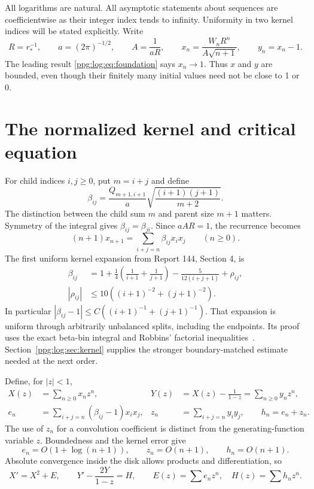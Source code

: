 \documentclass[11pt,letterpaper]{article}
\theoremstyle{remark}\newtheorem{remark}[theorem]{Remark}
\numberwithin{equation}{section}
\begin{document}
All logarithms are natural. All asymptotic statements about sequences are coefficientwise as their integer index tends to infinity. Uniformity in two kernel indices will be stated explicitly. Write
\begin{equation}\label{ppg:log:eq:normalization}
 R=r_*^{-1},\qquad a=(2\pi)^{-1/2},\qquad A=\frac1{aR},\qquad
 x_n=\frac{W_nR^n}{A\sqrt{n+1}},\qquad y_n=x_n-1.
\end{equation}
The leading result \eqref{ppg:log:eq:foundation} says $x_n\to1$. Thus $x$ and $y$ are bounded, even though their finitely many initial values need not be close to 1 or 0.

\section{The normalized kernel and critical equation}\label{ppg:log:sec:critical}
For child indices $i,j\ge0$, put $m=i+j$ and define
\begin{equation}\label{ppg:log:eq:beta}
 \beta_{ij}=\frac{Q_{m+1,i+1}}a
             \sqrt{\frac{(i+1)(j+1)}{m+2}}.
\end{equation}
The distinction between the child sum $m$ and parent size $m+1$ matters. Symmetry of the integral gives $\beta_{ij}=\beta_{ji}$. Since $aAR=1$, the recurrence becomes
\begin{equation}\label{ppg:log:eq:xrecurrence}
 (n+1)x_{n+1}=\sum_{i+j=n}\beta_{ij}x_ix_j\qquad(n\ge0).
\end{equation}
The first uniform kernel expansion from Report 144, Section 4, is
\begin{align}
 \beta_{ij}&=1+\frac14\left(\frac1{i+1}+\frac1{j+1}\right)
                    -\frac5{12(i+j+1)}+\rho_{ij},\label{ppg:log:eq:firstkernel}\\
 |\rho_{ij}|&\le10\left((i+1)^{-2}+(j+1)^{-2}\right).
 \label{ppg:log:eq:firstrho}
\end{align}
In particular $|\beta_{ij}-1|\le C((i+1)^{-1}+(j+1)^{-1})$. That expansion is uniform through arbitrarily unbalanced splits, including the endpoints. Its proof uses the exact beta-bin integral and Robbins' factorial inequalities~\cite{robbins}. Section~\ref{ppg:log:sec:kernel} supplies the stronger boundary-matched estimate needed at the next order.

Define, for $|z|<1$,
\begin{align*}
 X(z)&=\sum_{n\ge0}x_nz^n,&Y(z)&=X(z)-\frac1{1-z}=\sum_{n\ge0}y_nz^n,\\
 e_n&=\sum_{i+j=n}(\beta_{ij}-1)x_ix_j,&z_n&=\sum_{i+j=n}y_iy_j,\qquad h_n=e_n+z_n.
\end{align*}
The use of $z_n$ for a convolution coefficient is distinct from the generating-function variable $z$. Boundedness and the kernel error give
\begin{equation}\label{ppg:log:eq:coarseforcing}
 e_n=O(1+\log(n+1)),\qquad z_n=O(n+1),\qquad h_n=O(n+1).
\end{equation}
Absolute convergence inside the disk allows products and differentiation, so
\begin{equation}\label{ppg:log:eq:Riccati}
 X'=X^2+E,\qquad
 Y'-\frac{2Y}{1-z}=H,\qquad E(z)=\sum e_nz^n,\quad H(z)=\sum h_nz^n.
\end{equation}
\end{document}
